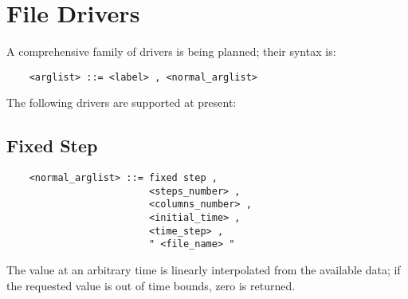 \section{File Drivers}
A comprehensive family of  drivers is being planned;
their syntax is:
\begin{verbatim}
    <arglist> ::= <label> , <normal_arglist>
\end{verbatim}
The following  drivers are supported at present:


\subsection{Fixed Step}
\begin{verbatim}
    <normal_arglist> ::= fixed step , 
                         <steps_number> ,
                         <columns_number> ,
                         <initial_time> ,
                         <time_step> ,
                         " <file_name> "
\end{verbatim}
The value at an arbitrary time is linearly interpolated from the available
data; if the requested value is out of time bounds, zero is returned.

